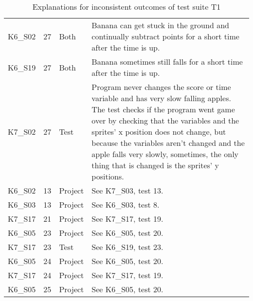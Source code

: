 \begin{table}[htpb]
{\begin{tabular}{lrlp{11.25cm}}
        K6\_S02 & 27   & Both    & Banana can get stuck in the ground and continually subtract points for a short time after the time is up. \\
        K6\_S19 & 27   & Both    & Banana sometimes still falls for a short time after the time is up. \\
        K7\_S02 & 27   & Test    & Program never changes the score or time variable and has very slow falling apples.
                                   The test checks if the program went game over by checking that the variables and the sprites' x position does not change,
                                   but because the variables aren't changed and the apple falls very slowly, sometimes, the only thing that is changed is the sprites' y positions. \\
        \midrule
        K6\_S02 & 13   & Project & See K7\_S03, test 13. \\
        K6\_S03 & 13   & Project & See K6\_S03, test 8.  \\
        K7\_S17 & 21   & Project & See K7\_S17, test 19. \\
        K6\_S05 & 23   & Project & See K6\_S05, test 20. \\
        K7\_S17 & 23   & Test    & See K6\_S19, test 23. \\
        K6\_S05 & 24   & Project & See K6\_S05, test 20. \\
        K7\_S17 & 24   & Project & See K7\_S17, test 19. \\
        K6\_S05 & 25   & Project & See K6\_S05, test 20. \\
        \bottomrule
    \end{tabular}
    }
    \caption{Explanations for inconsistent outcomes of test suite T1}
    \label{tab:inconsistencies_causes_normal}
\end{table}


